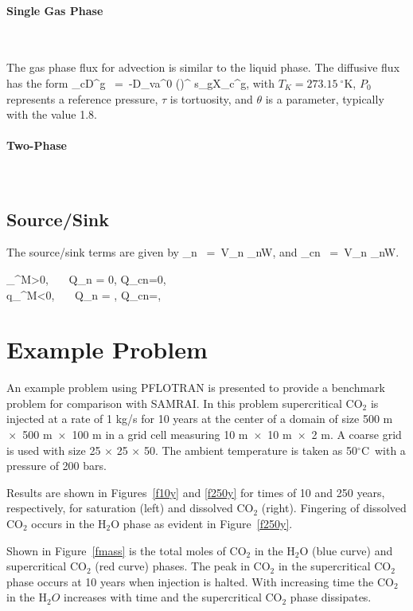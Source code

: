 \documentclass[12pt]{article}
\def\EQ#1\EN{\begin{equation}#1\end{equation}}
\def\BA#1\EA{\begin{align}#1\end{align}}
\newcommand{\eq}{\ =\ }
\newcommand{\degc}{$^\circ$C}
\renewcommand{\c}{{\rm CO_2}}
\renewcommand{\a}{{\alpha}}
\newcommand{\w}{{\rm H_2O}}
\renewcommand{\d}{{\delta}}
\begin{document}
\paragraph{Single Gas Phase}
~

The gas phase flux for advection is similar to the liquid phase. The diffusive flux has the form
\EQ
f_{cD}^g \eq -\phi\tau D_{va}^0 \left(\right)^\theta {} s_g\nabla X_c^g,
\EN
with $T_K = 273.15~^\circ$K, $P_0$ represents a reference pressure, $\tau$ is tortuosity, and $\theta$ is a parameter, typically with the value 1.8. 

\paragraph{Two-Phase}
~

\subsection{Source/Sink}

The source/sink terms are given by
\EQ
Q_n \eq \Big[W_\w^{-1} q_{l}^{M} + W_\c^{-1} q_{g}^{M}\Big] V_n \delta_{nW},
\EN
and
\EQ
Q_{cn} \eq \Big[W_\w^{-1} q_l^M X_c^l + W_\c^{-1} q_g^M X_c^g\Big] V_n \delta_{nW}.
\EN

\BA
q_\a^M>0, \ \ \ \d Q_n = 0, \d Q_{cn}=0,\\
q_\a^M<0, \ \ \ \d Q_n = \cdots, \d Q_{cn}=\cdots,
\EA

\section{Example Problem}

An example problem using PFLOTRAN is presented to provide a benchmark problem for comparison with SAMRAI. In this problem supercritical CO$_2$ is injected at a rate of 1 kg/s for 10 years at the center of a domain of size 500 m $\!\times\!$ 500 m $\!\times\!$ 100 m in a grid cell measuring 10 m $\!\times\!$ 10 m $\!\times\!$ 2 m. A coarse grid is used with size 25 $\times$ 25 $\times$ 50. The ambient temperature is taken as 50\degc\ with a pressure of 200 bars.

Results are shown in Figures~\ref{f10y} and \ref{f250y} for times of 10 and 250 years, respectively, for saturation (left) and dissolved CO$_2$ (right). Fingering of dissolved CO$_2$ occurs in the H$_2$O phase as evident in Figure~\ref{f250y}.

Shown in Figure~\ref{fmass} is the total moles of CO$_2$ in the H$_2$O (blue curve) and supercritical CO$_2$ (red curve) phases. The peak in CO$_2$ in the supercritical CO$_2$ phase occurs at 10 years when injection is halted. With increasing time the CO$_2$ in the H$_2O$ increases with time and the supercritical CO$_2$ phase dissipates.
\end{document}

